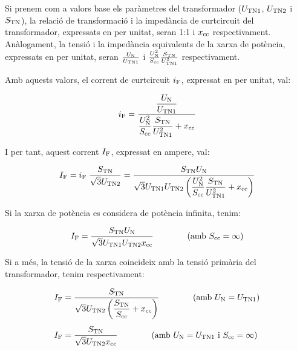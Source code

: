  Si prenem com a valors base els
par\`{a}metres del transformador ($U_\mathrm{TN1}$, $U_\mathrm{TN2}$ i
$S_\mathrm{TN}$), la relaci\'{o} de transformaci\'{o} i la imped\`{a}ncia de curtcircuit del transformador, expressats en per unitat, seran 1:1 i
$x_\mathrm{cc}$ respectivament. An\`{a}logament, la tensi\'{o} i la imped\`{a}ncia
equivalents de la xarxa de pot\`{e}ncia, expressats en per unitat, seran
$\frac{U_\mathrm{N}}{U_\mathrm{TN1}}$ i $\frac{U_\mathrm{N}^2}{S_\mathrm{cc}}
\frac{S_\mathrm{TN}}{U_\mathrm{TN1}^2}$ respectivament.

Amb aquests valors, el corrent de curtcircuit $i_\mathrm{F}$, expressat
en per unitat, val:

\begin{equation}
    i_\mathrm{F} = \frac{\dfrac{U_\mathrm{N}}{U_\mathrm{TN1}}}{\dfrac{U_\mathrm{N}^2}{S_\mathrm{cc}}
    \dfrac{S_\mathrm{TN}}{U_\mathrm{TN1}^2} + x_\mathrm{cc}}
\end{equation}

I per tant, aquest corrent $I_\mathrm{F}$, expressat en ampere, val:

\begin{equation}
    I_\mathrm{F} = i_\mathrm{F}\; \frac{S_\mathrm{TN}}{\sqrt{3}U_\mathrm{TN2}} =
    \frac{S_\mathrm{TN} U_\mathrm{N}}{\sqrt{3} U_\mathrm{TN1}U_\mathrm{TN2}
    \left(\dfrac{U_\mathrm{N}^2}{S_\mathrm{cc}}
    \dfrac{S_\mathrm{TN}}{U_\mathrm{TN1}^2} + x_\mathrm{cc}\right)}
\end{equation}

Si la xarxa de pot\`{e}ncia es considera de pot\`{e}ncia infinita, tenim:

\begin{equation}
    I_\mathrm{F} = \frac{S_\mathrm{TN} U_\mathrm{N}}{\sqrt{3} U_\mathrm{TN1}U_\mathrm{TN2}
    x_\mathrm{cc}}\qquad\qquad (\text{amb }S_\mathrm{cc}=\infty)
\end{equation}

Si a m\'{e}s, la tensi\'{o} de la xarxa coincideix amb la tensi\'{o} prim\`{a}ria
del transformador, tenim respectivament:

\begin{align}
    I_\mathrm{F} &= \frac{S_\mathrm{TN}}{\sqrt{3} U_\mathrm{TN2}
    \left(\dfrac{S_\mathrm{TN}}{S_\mathrm{cc}} +
    x_\mathrm{cc}\right)}\qquad\qquad(\text{amb }U_\mathrm{N}=U_\mathrm{TN1})\\[1ex]
    I_\mathrm{F} &= \frac{S_\mathrm{TN}}{\sqrt{3} U_\mathrm{TN2}
    x_\mathrm{cc}}\qquad\qquad(\text{amb }U_\mathrm{N}=U_\mathrm{TN1}\text{ i }
    S_\mathrm{cc}=\infty)
\end{align}

